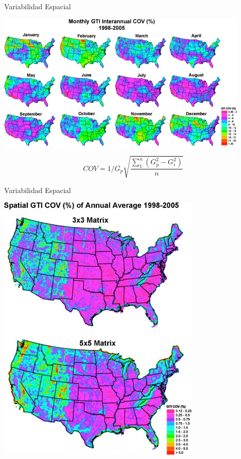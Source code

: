 \documentclass[xcolor={usenames,svgnames,dvipsnames}]{beamer}
\begin{document}
\begin{frame}[label={sec:org9609dce}]{Variabilidad Espacial}
\begin{center}
\includegraphics[width=0.9\textwidth]{../figs/SpatialVariability.jpg}
\end{center}

\[
COV = 1/G_p \sqrt{\frac{\sum_1^{n}(G_p^2 - G_i^2)}{n}}
\]

\nocite{Gueymard.Wilcox2011a}
\end{frame}

\begin{frame}[label={sec:org2d74eb4}]{Variabilidad Espacial}
\begin{center}
\begin{center}
\includegraphics[height=0.9\textheight]{../figs/SpatialVariability_Annual.jpg}
\end{center}
\end{center}
\end{frame}
\end{document}
